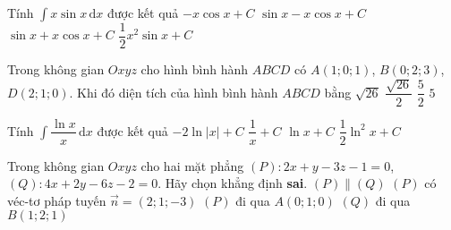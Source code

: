 \begin{ex}%
Tính $\displaystyle\int{x\sin x\mathrm{\,d}x}$ được kết quả 
\choice
{$-x\cos x+C$}
{\True $\sin x-x\cos x+C$}
{$\sin x+x\cos x+C$}
{$\dfrac{1}{2}x^2\sin x+C$}
\end{ex}


\begin{ex}%
Trong không gian $Oxyz$ cho hình bình hành $ABCD$ có $A(1;0;1)$, $B(0;2;3)$, $D(2;1;0)$. Khi đó diện tích của hình bình hành $ABCD$ bằng
\choice
{\True $\sqrt{26}$}
{$\dfrac{\sqrt{26}}{2}$}
{$\dfrac{5}{2}$}
{$5$}
\end{ex}


\begin{ex}%
Tính $\displaystyle\int{\dfrac{\ln x}{x}\mathrm{\,d}x}$ được kết quả 
\choice
{$-2\ln |x|+C$}
{$\dfrac{1}{x}+C$}
{$\ln x+C$}
{\True $\dfrac{1}{2}\ln^2 x+C$}
\end{ex}


\begin{ex}%
Trong không gian $Oxyz$ cho hai mặt phẳng $(P): 2x+y-3z-1=0$, $(Q): 4x+2y-6z-2=0$. Hãy chọn khẳng định \textbf{sai}.
\choice
{\True $(P)\parallel (Q)$}
{$(P)$ có véc-tơ pháp tuyến $\overrightarrow{n}=(2;1;-3)$}
{$(P)$ đi qua $A(0;1;0)$}
{$(Q)$ đi qua $B(1;2;1)$}
\end{ex}


